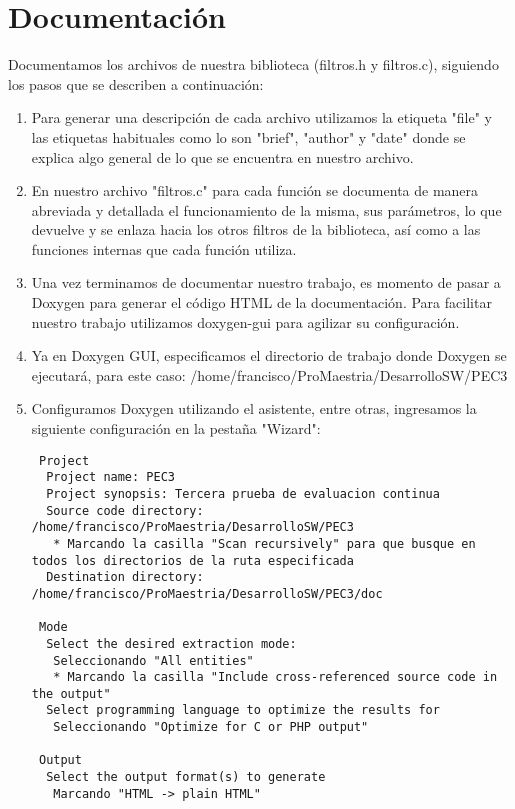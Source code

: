 \documentclass{article}
\begin{document}
  \section{Documentación}
  Documentamos los archivos de nuestra biblioteca (filtros.h y filtros.c), siguiendo los pasos que se describen a continuación:
  \begin{enumerate}
  \item Para generar una descripción de cada archivo utilizamos la etiqueta "file" y las etiquetas habituales como lo son "brief", "author" y "date" donde se explica algo general de lo que se encuentra en nuestro archivo.

  \item En nuestro archivo "filtros.c" para cada función se documenta de manera abreviada y detallada el funcionamiento de la misma, sus parámetros, lo que devuelve y se enlaza hacia los otros filtros de la biblioteca, así como a las funciones internas que cada función utiliza.

  \item Una vez terminamos de documentar nuestro trabajo, es momento de pasar a Doxygen para generar el código HTML de la documentación. Para facilitar nuestro trabajo utilizamos doxygen-gui para agilizar su configuración.

  \item Ya en Doxygen GUI, especificamos el directorio de trabajo donde Doxygen se ejecutará, para este caso:
 /home/francisco/ProMaestria/DesarrolloSW/PEC3

  \item Configuramos Doxygen utilizando el asistente, entre otras, ingresamos la siguiente configuración en la pestaña "Wizard":
  \begin{lstlisting}
 Project
  Project name: PEC3
  Project synopsis: Tercera prueba de evaluacion continua
  Source code directory: /home/francisco/ProMaestria/DesarrolloSW/PEC3
   * Marcando la casilla "Scan recursively" para que busque en todos los directorios de la ruta especificada
  Destination directory: /home/francisco/ProMaestria/DesarrolloSW/PEC3/doc

 Mode
  Select the desired extraction mode: 
   Seleccionando "All entities"
   * Marcando la casilla "Include cross-referenced source code in the output"
  Select programming language to optimize the results for
   Seleccionando "Optimize for C or PHP output"

 Output
  Select the output format(s) to generate
   Marcando "HTML -> plain HTML"


\end{lstlisting}
\end{enumerate}
\end{document}
